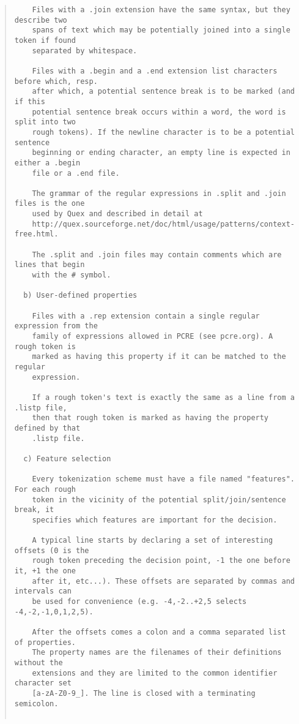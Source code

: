 \begin{scriptsize}
\begin{quote}
\begin{verbatim}
    Files with a .join extension have the same syntax, but they describe two
    spans of text which may be potentially joined into a single token if found
    separated by whitespace.

    Files with a .begin and a .end extension list characters before which, resp.
    after which, a potential sentence break is to be marked (and if this
    potential sentence break occurs within a word, the word is split into two
    rough tokens). If the newline character is to be a potential sentence
    beginning or ending character, an empty line is expected in either a .begin
    file or a .end file.

    The grammar of the regular expressions in .split and .join files is the one
    used by Quex and described in detail at
    http://quex.sourceforge.net/doc/html/usage/patterns/context-free.html.

    The .split and .join files may contain comments which are lines that begin
    with the # symbol.

  b) User-defined properties

    Files with a .rep extension contain a single regular expression from the
    family of expressions allowed in PCRE (see pcre.org). A rough token is
    marked as having this property if it can be matched to the regular
    expression.

    If a rough token's text is exactly the same as a line from a .listp file,
    then that rough token is marked as having the property defined by that
    .listp file.

  c) Feature selection

    Every tokenization scheme must have a file named "features". For each rough
    token in the vicinity of the potential split/join/sentence break, it
    specifies which features are important for the decision.

    A typical line starts by declaring a set of interesting offsets (0 is the
    rough token preceding the decision point, -1 the one before it, +1 the one
    after it, etc...). These offsets are separated by commas and intervals can
    be used for convenience (e.g. -4,-2..+2,5 selects -4,-2,-1,0,1,2,5).

    After the offsets comes a colon and a comma separated list of properties.
    The property names are the filenames of their definitions without the
    extensions and they are limited to the common identifier character set
    [a-zA-Z0-9_]. The line is closed with a terminating semicolon.


\end{verbatim}
\end{quote}
\end{scriptsize}
